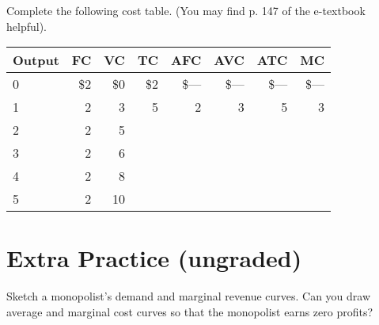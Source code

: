 \documentclass{exam}
\begin{document}
\begin{questions}
\question Complete the following cost table. (You may find p. 147 of the e-textbook helpful).
\vspace{1em}

\begin{large}
\begin{tabular}{ |l|r|r|r|r|r|r|r| } 
\hline
Output & FC & VC & TC & AFC & AVC & ATC & MC \\
 \hline
0 & \$2 & \$0 & \$2 & \$--- & \$--- & \$--- & \$--- \\ \hline
 1 & 2 &3 & 5 &2 & 3 & 5 & 3\\ \hline
 2 & 2 &5 & & & & & \\ \hline
 3 & 2 &6 & & & & & \\ \hline
 4 & 2 &8 & & & & & \\ \hline
 5 & 2 &10 & & & & & \\ \hline
\end{tabular}
\end{large}

\end{questions}

\section{Extra Practice (ungraded)}

\begin{questions}

\question Sketch a monopolist's demand and marginal revenue curves. Can you draw average and marginal cost curves so that the monopolist earns zero profits?

\end{questions}
\end{document}
